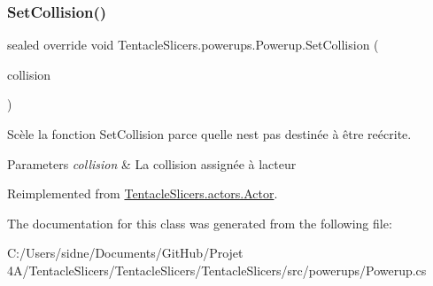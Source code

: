 \subsubsection{\texorpdfstring{Set\+Collision()}{SetCollision()}}
{\footnotesize\ttfamily sealed override void Tentacle\+Slicers.\+powerups.\+Powerup.\+Set\+Collision (\begin{DoxyParamCaption}\item[{\hyperlink{class_tentacle_slicers_1_1collisions_1_1_actor_collision}{Actor\+Collision}}]{collision }\end{DoxyParamCaption})\hspace{0.3cm}{\ttfamily [virtual]}}



Scèle la fonction Set\+Collision parce qu\textquotesingle{}elle n\textquotesingle{}est pas destinée à être reécrite. 


\begin{DoxyParams}{Parameters}
{\em collision} & La collision assignée à l\textquotesingle{}acteur \\
\hline
\end{DoxyParams}


Reimplemented from \hyperlink{class_tentacle_slicers_1_1actors_1_1_actor_a6e1eab5bc50ecb03842f49d0dc3b136e}{Tentacle\+Slicers.\+actors.\+Actor}.



The documentation for this class was generated from the following file\+:\begin{DoxyCompactItemize}
\item 
C\+:/\+Users/sidne/\+Documents/\+Git\+Hub/\+Projet 4\+A/\+Tentacle\+Slicers/\+Tentacle\+Slicers/\+Tentacle\+Slicers/src/powerups/Powerup.\+cs\end{DoxyCompactItemize}

